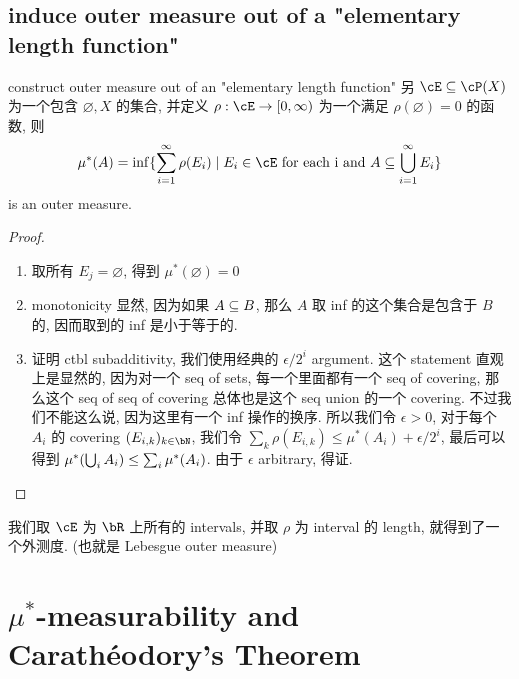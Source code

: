 \documentclass[lang=cn,11pt]{elegantbook}
\begin{document}
\section{induce outer measure out of a "elementary length function"}
\begin{theorem}{construct outer measure out of an "elementary  length function" }\label{construct outer measure out of a "elementary length function"}
    另 $\cE \sub \cP(X)$ 为一个包含 $\varnothing, X$ 的集合, 并定义 $\rho: \cE \rar [0,\infty)$ 为一个满足 $\rho(\varnothing) = 0$ 的函数, 则
\[
\mu^*(A )  = \inf \{    \sum_{i=1}^\infty \rho(E_i) \mid E_i \in \cE \text{ for each i and }  A \sub \union_{i=1}^\infty E_i    \}
\]
is an outer measure.
\end{theorem}
\begin{proof}
\begin{enumerate}
    \item 取所有 $E_j = \varnothing$, 得到 $\mu^*(\varnothing) = 0$
    \item monotonicity 显然, 因为如果 $A \subseteq B$, 那么 $A$ 取 inf 的这个集合是包含于 $B$ 的, 因而取到的 inf 是小于等于的.
    \item  证明 ctbl subadditivity, 我们使用经典的 $\epsilon  / 2^i$ argument. 这个 statement 直观上是显然的, 因为对一个 seq of sets, 每一个里面都有一个 seq of covering, 那么这个 seq of seq of covering 总体也是这个 seq union 的一个  covering. 不过我们不能这么说, 因为这里有一个 inf 操作的换序. 所以我们令 $\epsilon >0$, 对于每个 $A_i$ 的 covering $(E_{i,k})_{k\in\bN}$, 我们令 $\sum_k \rho(E_{i,k}) \leq \mu^*(A_i) + \epsilon / 2^i$,  最后可以得到 $\mu^*(\bigcup_i A_i) \leq \sum_i \mu^*(A_i)$. 由于 $\epsilon$ arbitrary, 得证.
\end{enumerate}
\end{proof}
\begin{example}
    我们取 $\cE$ 为 $\bR$ 上所有的 intervals, 并取 $\rho $ 为 interval 的 length, 就得到了一个外测度. (也就是 Lebesgue outer measure)
\end{example}





\chapter{$\mu^*$-measurability and Carathéodory's Theorem}
\end{document}
